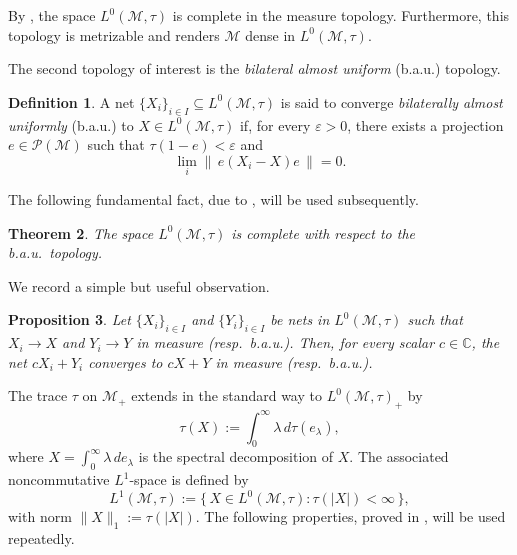 \documentclass[11pt]{amsart}
\newtheorem{thm}{Theorem}[section]
\newtheorem{prop}[thm]{Proposition}
\theoremstyle{definition}
\newtheorem{defn}[thm]{Definition}
\theoremstyle{myremark}
\numberwithin{equation}{section}
\begin{document}
By \cite[Theorem 1]{nelson1974notes}, the space \(L^{0}(\mathcal{M},\tau)\) is complete in the measure topology. Furthermore, this topology is metrizable and renders \(\mathcal{M}\) dense in \(L^{0}(\mathcal{M},\tau)\).

The second topology of interest is the \emph{bilateral almost uniform} (b.a.u.) topology.

\begin{defn}\label{bau conv defn}
A net \(\{X_i\}_{i\in I}\subseteq L^{0}(\mathcal{M},\tau)\) is said to converge \emph{bilaterally almost uniformly} (b.a.u.) to \(X\in L^{0}(\mathcal{M},\tau)\) if, for every \(\varepsilon>0\), there exists a projection \(e \in \mathcal{P}(\mathcal{M})\) such that \(\tau(1-e) < \varepsilon\) and 
\[
\lim_{i} \|\, e(X_i - X)e \,\| = 0.
\]
\end{defn}

The following fundamental fact, due to \cite[Theorem 2.2]{litvinov2024notes}, will be used subsequently.

\begin{thm}\label{complete wrt bau}
The space \(L^{0}(\mathcal{M},\tau)\) is complete with respect to the b.a.u.\ topology.
\end{thm}

We record a simple but useful observation.

\begin{prop}
Let \(\{X_i\}_{i\in I}\) and \(\{Y_i\}_{i\in I}\) be nets in \(L^{0}(\mathcal{M},\tau)\) such that \(X_i \to X\) and \(Y_i \to Y\) in measure (resp.\ b.a.u.). Then, for every scalar \(c\in \mathbb{C}\), the net \(cX_i + Y_i\) converges to \(cX+Y\) in measure (resp.\ b.a.u.).
\end{prop}

The trace \(\tau\) on \(\mathcal{M}_+\) extends in the standard way to \(L^{0}(\mathcal{M},\tau)_+\) by
\[
\tau(X) := \int_0^{\infty} \lambda \, d\tau(e_\lambda),
\]
where \(X = \int_{0}^{\infty} \lambda\, de_\lambda\) is the spectral decomposition of \(X\). The associated noncommutative \(L^1\)-space is defined by
\[
L^{1}(\mathcal{M},\tau)
 := \{\, X \in L^{0}(\mathcal{M},\tau) : \tau(|X|) < \infty \,\},
\]
with norm \(\|X\|_1 := \tau(|X|)\). The following properties, proved in \cite[Chapter 4]{hiai2021lectures}, will be used repeatedly.
\end{document}
